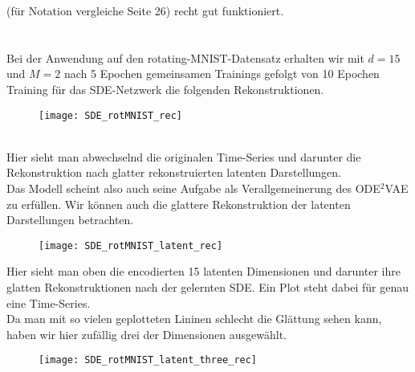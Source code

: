\documentclass[12pt]{article}
\begin{document}
	(für Notation vergleiche Seite 26) recht gut funktioniert.\\
	\\
	\\
	Bei der Anwendung auf den rotating-MNIST-Datensatz erhalten wir mit $d=15$ und $M=2$ nach 5 Epochen gemeinsamen Trainings gefolgt von 10 Epochen Training für das SDE-Netzwerk die folgenden Rekonstruktionen.
	\begin{figure}[!htbp]
		\centering
		\texttt{[image: SDE\_rotMNIST\_rec]}
	\end{figure}
	\\
	Hier sieht man abwechselnd die originalen Time-Series und darunter die Rekonstruktion nach glatter rekonstruierten latenten Darstellungen.\\
	Das Modell scheint also auch seine Aufgabe als Verallgemeinerung des ODE$^2$VAE zu erfüllen. Wir können auch die glattere Rekonstruktion der latenten Darstellungen betrachten.
	\newpage
	\begin{figure}[!htbp]
		\centering
		\texttt{[image: SDE\_rotMNIST\_latent\_rec]}
	\end{figure}
	\noindent
	Hier sieht man oben die encodierten 15 latenten Dimensionen und darunter ihre glatten Rekonstruktionen nach der gelernten SDE. Ein Plot steht dabei für genau eine Time-Series.\\
	Da man mit so vielen geplotteten Lininen schlecht die Glättung sehen kann, haben wir hier zufällig drei der Dimensionen ausgewählt.
	\begin{figure}[!htbp]
		\centering
		\texttt{[image: SDE\_rotMNIST\_latent\_three\_rec]}
	\end{figure}
	
	
	
	\newpage
\end{document}

